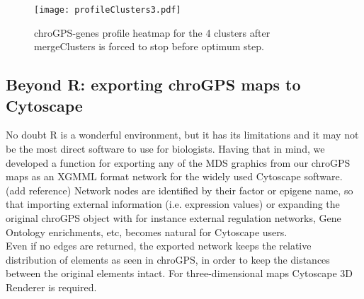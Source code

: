 \documentclass[a4paper,12pt,nogin]{article}
\newcommand{\drcomment}[1]{{\color{red} #1}} %
\begin{document}
\normalsize

\begin{figure}
\begin{center}
{\texttt{[image: profileClusters3.pdf]}}
\end{center}
\caption{chroGPS-genes profile heatmap for the 4 clusters after mergeClusters is forced to stop before optimum step.}
\label{fig:recluster5}
\end{figure}

\subsection{Beyond R: exporting chroGPS maps to Cytoscape}
\label{sec:export2Cytoscape}

No doubt R is a wonderful environment, but it has its limitations and
it may not be the most direct software to use for biologists. Having
that in mind, we developed a function for exporting any of the MDS
graphics from our chroGPS maps as an XGMML format network for the
widely used Cytoscape software.
\drcomment{(add reference)}
Network nodes are identified by their factor or epigene
name, so that importing external information (i.e. expression values)
or expanding the original chroGPS object with for instance external
regulation networks, Gene Ontology enrichments, etc, becomes natural
for Cytoscape users.
\\
Even if no edges are returned, the exported network keeps the relative
distribution of elements as seen in chroGPS, in order to keep the
distances between the original elements intact. For three-dimensional maps Cytoscape 3D Renderer is required.

\footnotesize

\begin{Schunk}
\end{Schunk}

\normalsize
\end{document}
